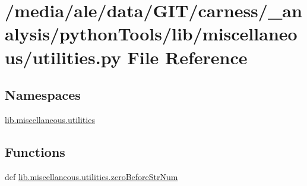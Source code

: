 \hypertarget{a00058}{\section{/media/ale/data/\-G\-I\-T/carness/\-\_\-analysis/python\-Tools/lib/miscellaneous/utilities.py File Reference}
\label{a00058}
}
\subsection*{Namespaces}
\begin{DoxyCompactItemize}
\item 
\hyperlink{a00116}{lib.\-miscellaneous.\-utilities}
\end{DoxyCompactItemize}
\subsection*{Functions}
\begin{DoxyCompactItemize}
\item 
def \hyperlink{a00116_a81d1a8007a66968f88ef35e2fa03a012}{lib.\-miscellaneous.\-utilities.\-zero\-Before\-Str\-Num}
\end{DoxyCompactItemize}
